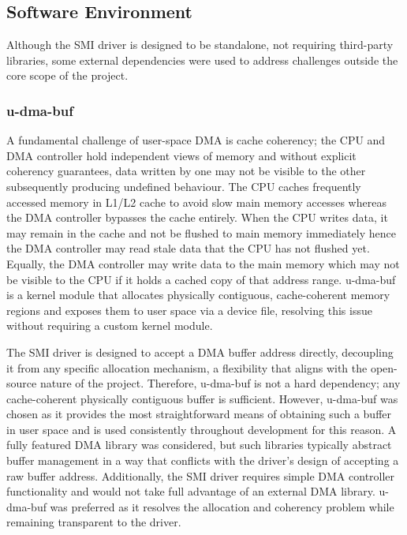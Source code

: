 \documentclass[final]{cmpreport}
\begin{document}
\subsection{Software Environment}
Although the SMI driver is designed to be standalone, not requiring third-party libraries, some external dependencies were used to address challenges outside the core scope of the project.

\subsubsection{u-dma-buf}
A fundamental challenge of user-space DMA is cache coherency; the CPU and DMA controller hold independent views of memory and without explicit coherency guarantees, data written by one may not be visible to the other subsequently producing undefined behaviour. The CPU caches frequently accessed memory in L1/L2 cache to avoid slow main memory accesses whereas the DMA controller bypasses the cache entirely. When the CPU writes data, it may remain in the cache and not be flushed to main memory immediately hence the DMA controller may read stale data that the CPU has not flushed yet. Equally, the DMA controller may write data to the main memory which may not be visible to the CPU if it holds a cached copy of that address range. u-dma-buf~\cite{ichiroIkwzmUdmabuf2026} is a kernel module that allocates physically contiguous, cache-coherent memory regions and exposes them to user space via a device file, resolving this issue without requiring a custom kernel module.

The SMI driver is designed to accept a DMA buffer address directly, decoupling it from any specific allocation mechanism, a flexibility that aligns with the open-source nature of the project. Therefore, u-dma-buf is not a hard dependency; any cache-coherent physically contiguous buffer is sufficient. However, u-dma-buf was chosen as it provides the most straightforward means of obtaining such a buffer in user space and is used consistently throughout development for this reason.
A fully featured DMA library was considered, but such libraries typically abstract buffer management in a way that conflicts with the driver's design of accepting a raw buffer address. Additionally, the SMI driver requires simple DMA controller functionality and would not take full advantage of an external DMA library. u-dma-buf was preferred as it resolves the allocation and coherency problem while remaining transparent to the driver.
\end{document}
